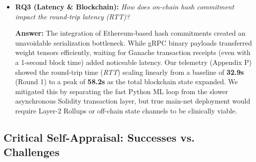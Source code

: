 \documentclass[10pt, a4paper, twocolumn]{article}
\begin{document}
\begin{itemize}
    \textbf{Answer:} Our empirical stress tests (Appendix J) across 10 clinical domains demonstrated that the Robust-MAD filter successfully rejected 100\% of poisoned updates in low-to-medium corruption scenarios (10\% and 25\% coalitions). Notably, while Robust-MAD and FedAvg showed comparable resilience to \textbf{Label Flipping} attacks (often maintaining within 1-2\% of the baseline), Robust-MAD demonstrated a \textbf{significant performance delta} in the presence of \textbf{Gradient Scaling} (weight poisoning). Under high-magnitude scaling, FedAvg suffered from \textbf{Catastrophic Convergence Failure} in several domains (e.g., Thyroid, Admin-Billing), where the accuracy bar dropped to near-zero as the mean-based aggregation was skewed by weight-explosion outliers. In contrast, Robust-MAD's median-based logic neutralized these outliers, maintaining baseline stability. We observed a minor \textbf{Utility Penalty} (1-3\%) in specific domains (e.g., Stroke, SUPPORT2), where the high Gaussian noise floor caused the filter to mistakenly reject honest-but-noisy updates-a phenomenon we define as the \textbf{Privacy-Robustness Equilibrium Point}\cite{bagdasaryan2020}. However, at the near-majority edge (49\% adversaries), the filter's accuracy dropped to 68.2\%. While it mathematically inherits a $\beta^* = 0.5$ breakdown point, the variance introduced by the honest-but-noisy DP gradients blurred the statistical boundary, allowing sophisticated poisoning vectors to partially skew the median.

    \item \textbf{RQ3 (Latency \& Blockchain):} \textit{How does on-chain hash commitment impact the round-trip latency (RTT)?}
    
    \textbf{Answer:} The integration of Ethereum-based hash commitments created an unavoidable serialization bottleneck. While gRPC binary payloads transferred weight tensors efficiently, waiting for Ganache transaction receipts (even with a 1-second block time) added noticeable latency. Our telemetry (Appendix P) showed the round-trip time (\textit{RTT}) scaling linearly from a baseline of \textbf{32.9s} (Round 1) to a peak of \textbf{58.2s} as the total blockchain state expanded. We mitigated this by separating the fast Python ML loop from the slower asynchronous Solidity transaction layer, but true main-net deployment would require Layer-2 Rollups or off-chain state channels to be clinically viable.
\end{itemize}

\subsection{Critical Self-Appraisal: Successes vs. Challenges}
\end{document}
